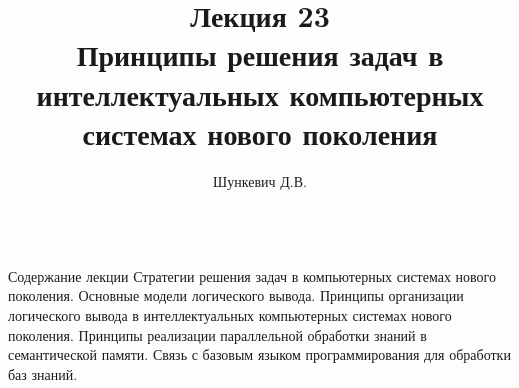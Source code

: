 \title{Лекция 23\\Принципы решения задач в интеллектуальных компьютерных системах нового поколения}
\author[]{Шункевич Д.В.}

\begin{frame}
	\titlepage
\end{frame}

\begin{frame}{\\Содержание лекции}
	\topline
	\justifying
	Стратегии решения задач в компьютерных системах нового поколения. Основные модели логического вывода. Принципы организации логического вывода в интеллектуальных компьютерных системах нового поколения. Принципы реализации параллельной обработки знаний в семантической памяти. Связь с базовым языком программирования для обработки баз знаний. 
\end{frame}

